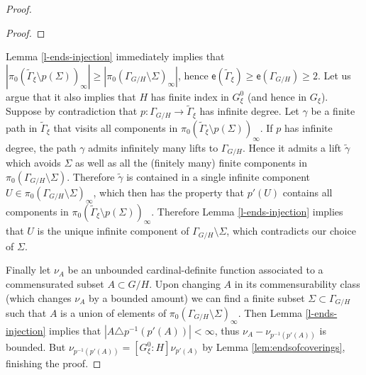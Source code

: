 \documentclass[11pt]{amsart}
\newcommand{\Gammatilde}{\ensuremath{\widetilde{\Gamma}}}%
\newcommand{\esf}{\ensuremath{\mathsf{e}}}
\theoremstyle{definition}
\theoremstyle{plain}
\newtheorem{main thm}{Theorem}
\theoremstyle{remark}
\theoremstyle{plain}
\begin{document}
\begin{proof}
\begin{proof}
\end{proof}

Lemma \ref{l-ends-injection} immediately implies that $|\pi_0(\Gammatilde_\xi\setminus p(\Sigma))_\infty|\ge |\pi_0(\Gamma_{G/H}\setminus \Sigma)_\infty|$,
hence $\esf(\Gammatilde_\xi)\ge\esf(\Gamma_{G/H})\ge 2$. Let us argue that it also implies that $H$ has finite index in $G^0_\xi$ (and hence in $G_\xi$). Suppose by contradiction that $p\colon \Gamma_{G/H}\to \Gammatilde_\xi$ has infinite degree. Let $\gamma$ be a finite path in $\Gammatilde_\xi$ that visits all components in $\pi_0(\Gammatilde_\xi\setminus p(\Sigma))_\infty$. If $p$ has infinite degree, the path $\gamma$ admits infinitely many lifts to $\Gamma_{G/H}$. Hence it admits a lift $\tilde{\gamma}$ which avoids $\Sigma$ as well as all the (finitely many) finite components in $\pi_0(\Gamma_{G/H}\setminus \Sigma)$.  Therefore $\tilde{\gamma}$ is contained in a single infinite component $U\in \pi_0(\Gamma_{G/H}\setminus \Sigma)_\infty$, which then has the property that $p'(U)$ contains all components in $\pi_0(\Gammatilde_\xi\setminus p(\Sigma))_\infty$. Therefore Lemma \ref{l-ends-injection} implies that $U$ is the unique infinite component of $\Gamma_{G/H}\setminus \Sigma$, which contradicts our choice of $\Sigma$.

Finally let $\nu_A$ be an unbounded cardinal-definite function associated to a commensurated subset $A\subset G/H$. Upon changing $A$ in its commensurability class (which changes $\nu_A$ by a bounded amount) we can find a finite subset $\Sigma\subset \Gamma_{G/H}$ such that $A$ is a union of elements of $\pi_0(\Gamma_{G/H}\setminus \Sigma)_
\infty$. Then Lemma \ref{l-ends-injection} implies that  $|A\triangle p^{-1}(p'(A))|<\infty$, thus $\nu_A-\nu_{p^{-1}(p'(A))}$ is bounded. But $\nu_{p^{-1}(p'(A))}=[G^0_\xi \colon H]\nu_{p'(A)}$ by Lemma \ref{lem:endsofcoverings}, finishing the proof. \qedhere

\end{proof}
\end{document}
